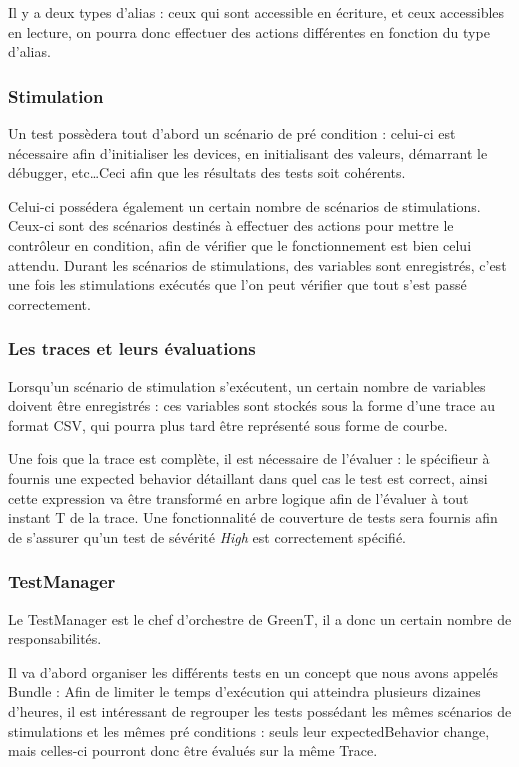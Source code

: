 		Il y a deux types d'alias : ceux qui sont accessible en écriture, et ceux accessibles en lecture, on pourra donc effectuer des actions différentes en fonction du type d'alias.

	\subsubsection{Stimulation} \label{stim}
		Un test possèdera tout d'abord un scénario de pré condition : celui-ci est nécessaire afin d'initialiser les devices, en initialisant des valeurs, démarrant le débugger, etc\ldots Ceci afin que les résultats des tests soit cohérents.

		Celui-ci possédera également un certain nombre de scénarios de stimulations. Ceux-ci sont des scénarios destinés à effectuer des actions pour mettre le contrôleur en condition, afin de vérifier que le fonctionnement est bien celui attendu. Durant les scénarios de stimulations, des variables sont enregistrés, c'est une fois les stimulations exécutés que l'on peut vérifier que tout s'est passé correctement.

	\subsubsection{Les traces et leurs évaluations}\label{expectedBehavior}
	Lorsqu'un scénario de stimulation s'exécutent, un certain nombre de variables doivent être enregistrés : ces variables sont stockés sous la forme d'une trace au format CSV, qui pourra plus tard être représenté sous forme de courbe. 

	Une fois que la trace est complète, il est nécessaire de l'évaluer : le spécifieur à fournis une expected behavior détaillant dans quel cas le test est correct, ainsi cette expression va être transformé en arbre logique afin de l'évaluer à tout instant T de la trace. Une fonctionnalité de couverture de tests sera fournis afin de s'assurer qu'un test de sévérité \textit{High} est correctement spécifié.

	\subsubsection{TestManager}\label{testManager}
	Le TestManager est le chef d'orchestre de GreenT, il a donc un certain nombre de responsabilités. 

	Il va d'abord organiser les différents tests en un concept que nous avons appelés Bundle : Afin de limiter le temps d'exécution qui atteindra plusieurs dizaines d'heures, il est intéressant de regrouper les tests possédant les mêmes scénarios de stimulations et les mêmes pré conditions : seuls leur expectedBehavior change, mais celles-ci pourront donc être évalués sur la même Trace.

